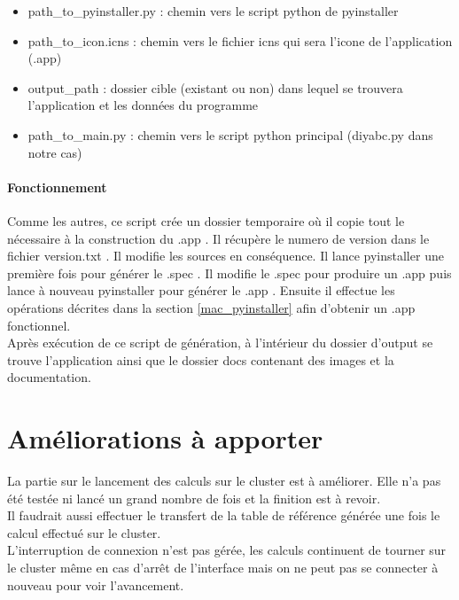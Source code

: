 \documentclass[12pt,a4paper]{article}
\begin{document}
        \begin{itemize}
            \item path\_to\_pyinstaller.py : chemin vers le script python de pyinstaller
            \item path\_to\_icon.icns : chemin vers le fichier icns qui sera l'icone de l'application (.app)
            \item output\_path : dossier cible (existant ou non) dans lequel se trouvera l'application et les données du programme
            \item path\_to\_main.py : chemin vers le script python principal (diyabc.py dans notre cas)\\
        \end{itemize}

        \paragraph{Fonctionnement}

        Comme les autres, ce script crée un dossier temporaire où il copie tout
        le nécessaire à la construction du .app .  Il récupère le numero de
        version dans le fichier version.txt . Il modifie les sources en
        conséquence. Il lance pyinstaller une première fois pour générer le
        .spec . Il modifie le .spec pour produire un .app puis lance à nouveau
        pyinstaller pour générer le .app .  Ensuite il effectue les opérations
        décrites dans la section \ref{mac_pyinstaller} afin d'obtenir un .app
        fonctionnel.\\

        Après exécution de ce script de génération, à l'intérieur du dossier
        d'output se trouve l'application ainsi que le dossier docs contenant des
        images et la documentation.

\section{Améliorations à apporter}
    La partie sur le lancement des calculs sur le cluster est à améliorer. Elle
    n'a pas été testée ni lancé un grand nombre de fois et la finition est à
    revoir.\\
    
    Il faudrait aussi effectuer le transfert de la table de référence
    générée une fois le calcul effectué sur le cluster.\\
    
    L'interruption de
    connexion n'est pas gérée, les calculs continuent de tourner sur le cluster
    même en cas d'arrêt de l'interface mais on ne peut pas se connecter à
    nouveau pour voir l'avancement.
\end{document}
